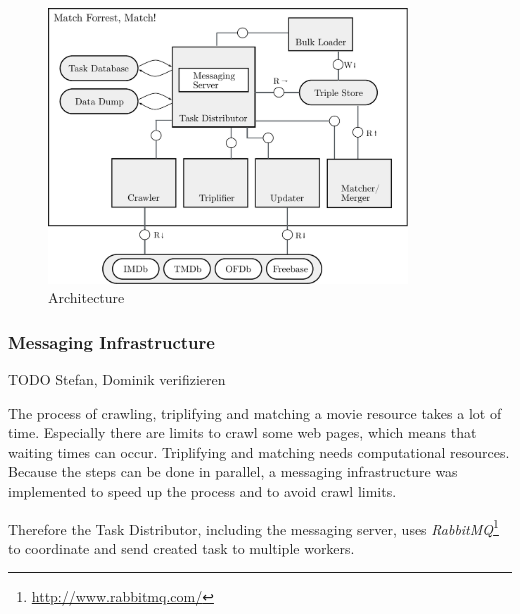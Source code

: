 \begin{figure}[ht]
  \begin{center}
  \includegraphics[width=0.85\textwidth]{images/architecture.pdf}
  \end{center}
  \caption{Architecture}
  \label{fig_architecture}
\end{figure}

\subsubsection{Messaging Infrastructure}
\label{subsubsec_messaging_infrastructure}

TODO Stefan, Dominik verifizieren

The process of crawling, triplifying and matching a movie resource takes a lot of time.
Especially there are limits to crawl some web pages, which means that waiting times can occur. Triplifying and matching needs computational resources.
Because the steps can be done in parallel, a messaging infrastructure was implemented to speed up the process and to avoid crawl limits.

Therefore the Task Distributor, including the messaging server, uses \emph{RabbitMQ}\footnote{\url{http://www.rabbitmq.com/}} to coordinate and send created task to multiple workers.

